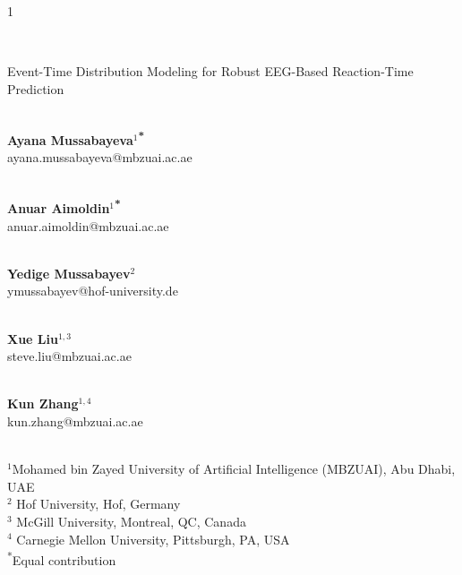 \documentclass[12pt]{article}
\begin{document}
\hspace{13.9cm}1

\ \vspace{20mm}\\

\begin{center}{\LARGE Event-Time Distribution Modeling for Robust EEG-Based Reaction-Time Prediction}
\end{center}

\ \\
{\bf \large Ayana Mussabayeva$^{1}$\textsuperscript{*}}\\
ayana.mussabayeva@mbzuai.ac.ae

\ \\ {\bf \large Anuar Aimoldin$^{1}$\textsuperscript{*}}\\
anuar.aimoldin@mbzuai.ac.ae




\ \\ {\bf \large Yedige Mussabayev$^{\displaystyle 2}$}\\
ymussabayev@hof-university.de

\ \\ {\bf \large Xue Liu$^{\displaystyle 1, 3}$}\\
steve.liu@mbzuai.ac.ae

\ \\ {\bf \large Kun Zhang$^{\displaystyle 1, 4}$}\\
kun.zhang@mbzuai.ac.ae


\ \\
{$^{\displaystyle 1}$Mohamed bin Zayed University of Artificial Intelligence (MBZUAI), Abu Dhabi, UAE}
\ \\
{$^{\displaystyle 2}$ Hof University, Hof, Germany}
\ \\
{$^{\displaystyle 3}$ McGill University, Montreal, QC, Canada}
\ \\
{$^{\displaystyle 4}$ Carnegie Mellon University, Pittsburgh, PA, USA}
\ \\
{\normalsize \textsuperscript{*}Equal contribution}\\
\end{document}
